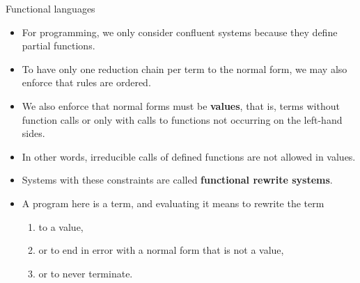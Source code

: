 %
\begin{frame}{Functional languages}

  \begin{itemize}

    \item For programming, we only consider confluent systems because
      they define partial functions.

    \item To have only one reduction chain per term to the normal
      form, we may also enforce that rules are ordered.

    \item We also enforce that normal forms must be \textbf{values},
      that is, terms without function calls or only with calls to
      functions not occurring on the left\hyp{}hand sides.

    \item In other words, irreducible calls of defined functions are
      not allowed in values.

    \item Systems with these constraints are called \textbf{functional
      rewrite systems}.

    \item A program here is a term, and evaluating it means to rewrite
      the term
      \begin{enumerate}
        \item to a value,
        \item or to end in error with a normal form that is not a value,
        \item or to never terminate.
      \end{enumerate}

  \end{itemize}

\end{frame}

